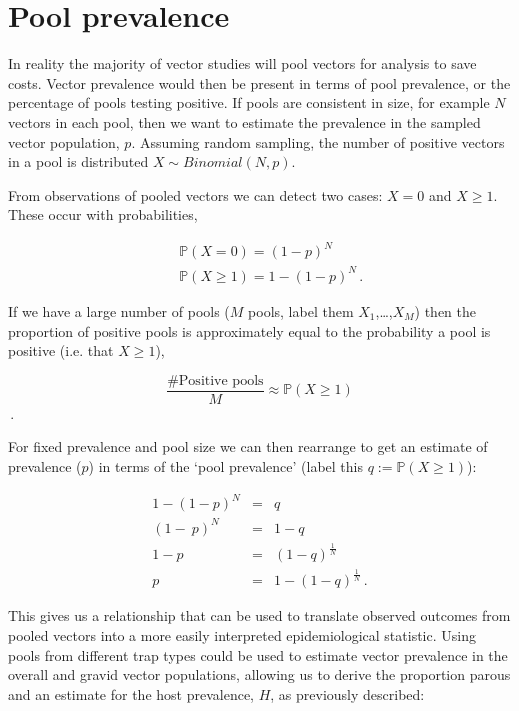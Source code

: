 \section{Pool prevalence}

In reality the majority of vector studies will pool vectors for analysis to save costs. Vector prevalence would then be present in terms of pool prevalence, or the percentage of pools testing positive. If pools are consistent in size, for example $N$ vectors in each pool, then we want to estimate the prevalence in the sampled vector population, $p$. Assuming random sampling, the number of positive vectors in a pool is distributed $X \sim Binomial(N,p)$.

From observations of pooled vectors we can detect two cases: $X=0$ and $X\geq1$. These occur with probabilities,

\begin{eqnarray}
&&\mathbb{P}(X=0) = (1-p)^N\\
&&\mathbb{P}(X\geq1) = 1-(1-p)^N \,.
\end{eqnarray}

If we have a large number of pools ($M$ pools, label them $X_1$,\dots,$X_M$) then the proportion of positive pools is approximately equal to the probability a pool is positive (i.e. that $X\geq1$),

\begin{equation}
\frac{\mbox{\# Positive pools}}{M} \approx \mathbb{P}(X\geq1)
\end{equation}\,.

For fixed prevalence and pool size we can then rearrange to get an estimate of prevalence ($p$) in terms of the `pool prevalence' (label this $q := \mathbb{P}(X\geq1)$):

\begin{eqnarray}
1-(1-p)^N &=& q\\
(1-~p)^N &=& 1-q\\
1-p~ &=& (1-q)^{\frac{1}{N}}\\
p &=& 1-(1-q)^{\frac{1}{N}}\,.
\end{eqnarray}

This gives us a relationship that can be used to translate observed outcomes from pooled vectors into a more easily interpreted epidemiological statistic. Using pools from different trap types could be used to estimate vector prevalence in the overall and gravid vector populations, allowing us to derive the proportion parous and an estimate for the host prevalence, $H$, as previously described:

